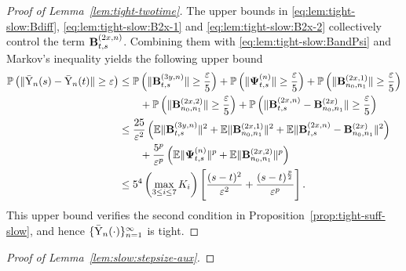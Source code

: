 \documentclass[11pt]{article}
\theoremstyle{plain}
\theoremstyle{definition}
\def\eps{{\varepsilon}}
\def\EB{{\mathbb E}}
\def\PB{{\mathbb P}}
\newcommand{\ybar}{{\bar{\textnormal{Y}}}}
\def\Psii{\mbox{\boldmath$\Psi$\unboldmath}}
\def\bfB{{\bf B}}
\begin{document}
\begin{appendix}
\begin{proof}[Proof of Lemma~\ref{lem:tight-twotime}]
    The upper bounds in \eqref{eq:lem:tight-slow:Bdiff}, \eqref{eq:lem:tight-slow:B2x-1} and \eqref{eq:lem:tight-slow:B2x-2} collectively control the term $\bfB^{(2x,n)}_{t,s}$.
    Combining them with  \eqref{eq:lem:tight-slow:BandPsi} and Markov's inequality yields the following upper bound
    \begin{align*}
        \PB \left( 
        \| \ybar_{n}(s) - \ybar_{n}(t) \| \ge \eps \right)
        & \le \PB \left( 
        \| \bfB^{(3y,n)}_{t,s} \| \ge \frac{\eps}{5} \right) + \PB \left( 
        \| \Psii^{(n)}_{t,s} \| \ge \frac{\eps}{5} \right) 
        + \PB \left( \| \bfB^{(2x,1)}_{n_0,n_1} \| \ge \frac{\eps}{5} \right) \\
        & \qquad + \PB \left( \| \bfB^{(2x,2)}_{n_0,n_1} \| \ge \frac{\eps}{5} \right)
        + \PB \left( \| \bfB^{(2x,n)}_{t,s} - \bfB^{(2x)}_{n_0, n_1} \| \ge \frac{\eps}{5} \right)
        \\
        & \le \frac{25}{\eps^2} \left( \EB  \| \bfB^{(3y,n)}_{t,s} \|^2 + \EB \| \bfB^{(2x,1)}_{n_0,n_1} \|^2 + \EB \| \bfB^{(2x,n)}_{t,s} - \bfB^{(2x)}_{n_0, n_1} \|^2 \right) \\
        & \qquad + \frac{5^p}{\eps^p} \left( \EB \| \Psii^{(n)}_{t,s} \|^p + \EB \| \bfB^{(2x,2)}_{n_0,n_1} \|^p \right) \\
        & 
        \le 5^4 \left( \max_{3 \le i \le 7} K_i \right) \left[ \frac{ (s-t)^2 }{\eps^2} + \frac{ (s-t)^\frac{p}{2} }{\eps^p} \right].
    \end{align*}
    This upper bound verifies the second condition in Proposition~\ref{prop:tight-suff-slow}, and hence $\{ \ybar_{n}(\cdot) \}_{n=1}^\infty$ is tight.
\end{proof}

\begin{proof}[Proof of Lemma~\ref{lem:slow:stepsize-aux}]
    

\end{proof}
\end{appendix}
\end{document}
